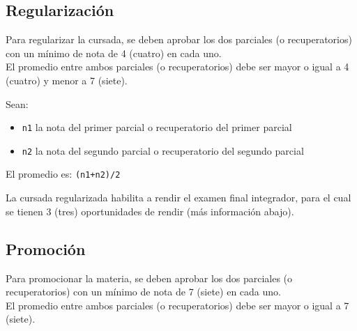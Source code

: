 \documentclass[
  letterpaper,
  DIV=11,
  numbers=noendperiod]{scrreprt}
\providecommand{\tightlist}{%
  \setlength{\itemsep}{0pt}\setlength{\parskip}{0pt}}\usepackage{longtable,booktabs,array}
\begin{document}
\subsection*{Regularización}\label{regularizaciuxf3n}

Para regularizar la cursada, se deben aprobar los dos parciales (o
recuperatorios) con un mínimo de nota de 4 (cuatro) en cada uno.\\
El promedio entre ambos parciales (o recuperatorios) debe ser mayor o
igual a 4 (cuatro) y menor a 7 (siete).

\begin{tcolorbox}[enhanced jigsaw, opacityback=0, coltitle=black, toptitle=1mm, colframe=quarto-callout-tip-color-frame, leftrule=.75mm, colback=white, opacitybacktitle=0.6, toprule=.15mm, breakable, bottomrule=.15mm, rightrule=.15mm, bottomtitle=1mm, titlerule=0mm, title=\textcolor{quarto-callout-tip-color}{\faLightbulb}\hspace{0.5em}{¿Cómo calculo Promedio?}, colbacktitle=quarto-callout-tip-color!10!white, left=2mm, arc=.35mm]

Sean:

\begin{itemize}
\tightlist
\item
  \texttt{n1} la nota del primer parcial o recuperatorio del primer
  parcial
\item
  \texttt{n2} la nota del segundo parcial o recuperatorio del segundo
  parcial
\end{itemize}

El promedio es: \texttt{(n1+n2)/2}

\end{tcolorbox}

La cursada regularizada habilita a rendir el examen final integrador,
para el cual se tienen 3 (tres) oportunidades de rendir (más información
abajo).

\subsection*{Promoción}\label{promociuxf3n}

Para promocionar la materia, se deben aprobar los dos parciales (o
recuperatorios) con un mínimo de nota de 7 (siete) en cada uno.\\
El promedio entre ambos parciales (o recuperatorios) debe ser mayor o
igual a 7 (siete).
\end{document}
